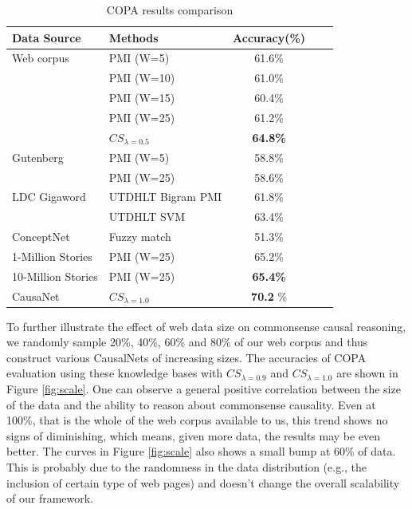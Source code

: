 \documentclass[letterpaper]{article}
\newcommand{\figref}[1]{Figure \ref{#1}}
\begin{document}
\begin{table}[th]
\small
\centering
\caption{COPA results comparison}
\label{tab:evaluation}
\begin{tabular}{llccc}
\hline
Data Source & Methods & Accuracy(\%) \\
\hline
Web corpus & PMI (W=5) & 61.6\% \\
& PMI (W=10) & 61.0\% \\
& PMI (W=15) & 60.4\% \\
& PMI (W=25) & 61.2\% \\
& {\bf $CS_{\lambda=0.5}$} & {\bf 64.8\%} \\
\hline
Gutenberg & PMI (W=5)  & 58.8\% \\
& PMI (W=25) & 58.6\% \\
\hline
LDC Gigaword & UTDHLT Bigram PMI & 61.8\% \\
 & UTDHLT SVM & 63.4\% \\
\hline
ConceptNet & Fuzzy match & 51.3\% \\
\hline
1-Million Stories & PMI (W=25) & 65.2\% \\
10-Million Stories & PMI (W=25) & {\bf 65.4\%} \\ \hline
CausaNet & {\bf $CS_{\lambda = 1.0}$ } & {\bf 70.2} \%  \\
\hline
\end{tabular}
\end{table}

To further illustrate the effect of web data size on
commonsense causal reasoning, we randomly sample
20\%, 40\%, 60\% and 80\% of our web corpus and thus construct
various CausalNets of increasing sizes. The accuracies of
COPA evaluation using these knowledge bases with $CS_{\lambda=0.9}$
and $CS_{\lambda=1.0}$ are shown in \figref{fig:scale}.
One can observe a general positive correlation between the size of the data
and the ability to reason about commonsense causality. Even at 100\%,
that is the whole of the web corpus available to us, this trend shows
no signs of diminishing, which means, given more data, the results may be
even better. The curves in \figref{fig:scale} also shows a
small bump at 60\% of data.
This is probably due to the randomness in the data distribution (e.g., the
inclusion of certain type of web pages) and doesn't change the overall
scalability of our framework.
\end{document}
